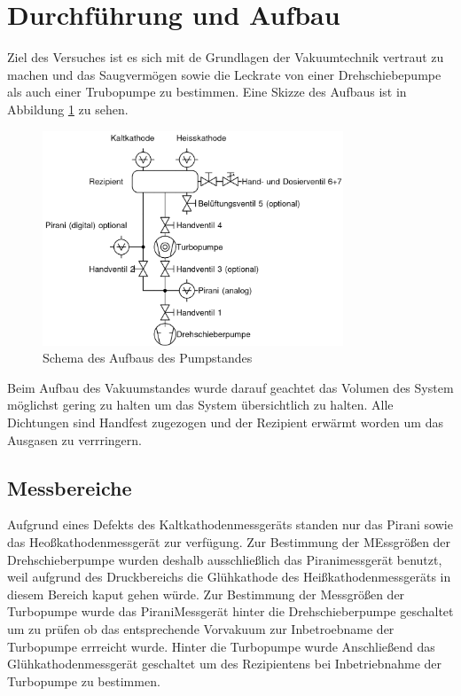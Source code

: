 \section{Durchführung und Aufbau}
\label{sec:Durchführung}
Ziel des Versuches ist es sich mit de Grundlagen der Vakuumtechnik vertraut zu machen und das Saugvermögen sowie die Leckrate von einer Drehschiebepumpe als auch einer Trubopumpe zu bestimmen. Eine Skizze des Aufbaus ist in Abbildung \ref{fig:pump} zu sehen. 
\begin{figure}[htpb]
  \centering
\includegraphics[width=0.8\textwidth]{picture/pumpaufbau.png}
\caption{Schema des Aufbaus des Pumpstandes \cite{Pfeiffer}}
  \label{fig:pump}
\end{figure}
Beim Aufbau des Vakuumstandes wurde darauf geachtet das Volumen des System möglichst gering zu halten um das System übersichtlich zu halten. Alle Dichtungen sind Handfest zugezogen und der Rezipient erwärmt worden um das Ausgasen zu verrringern. 
\subsection{Messbereiche}
Aufgrund eines Defekts des Kaltkathodenmessgeräts standen nur das Pirani sowie das Heoßkathodenmessgerät zur verfügung. Zur Bestimmung der MEssgrößen der Drehschieberpumpe wurden deshalb ausschließlich das Piranimessgerät benutzt, weil aufgrund des Druckbereichs die Glühkathode des Heißkathodenmessgeräts in diesem Bereich kaput gehen würde. \newline
Zur Bestimmung der Messgrößen der Turbopumpe wurde das PiraniMessgerät hinter die Drehschieberpumpe geschaltet um zu prüfen ob das entsprechende Vorvakuum zur Inbetroebname der Turbopumpe errreicht wurde. Hinter die Turbopumpe wurde Anschließend das Glühkathodenmessgerät geschaltet um des Rezipientens bei Inbetriebnahme der Turbopumpe zu bestimmen. 
